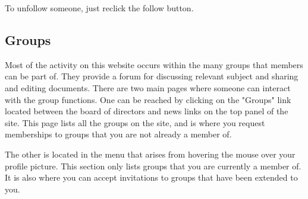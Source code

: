 \documentclass[10pt]{article}
\begin{document}
\begin{flushleft}
To unfollow someone, just reclick the follow button.  
\end{flushleft}

\subsection{Groups}



\begin{flushleft}
Most of the activity on this website occurs within the many groups that members can be part of.  They provide a forum for discussing relevant subject and sharing and editing documents.  There are two main pages where someone can interact with the group functions.  One can be reached by clicking on the "Groups" link located between the board of directors and news links on the top panel of the site.  This page lists all the groups on the site, and is where you request memberships to groups that you are not already a member of.
\end{flushleft}

\begin{flushleft}
The other is located in the menu that arises from hovering the mouse over your profile picture. This section only lists groups that you are currently a member of.  It is also where you can accept invitations to groups that have been extended to you.
\end{flushleft}
\end{document}
